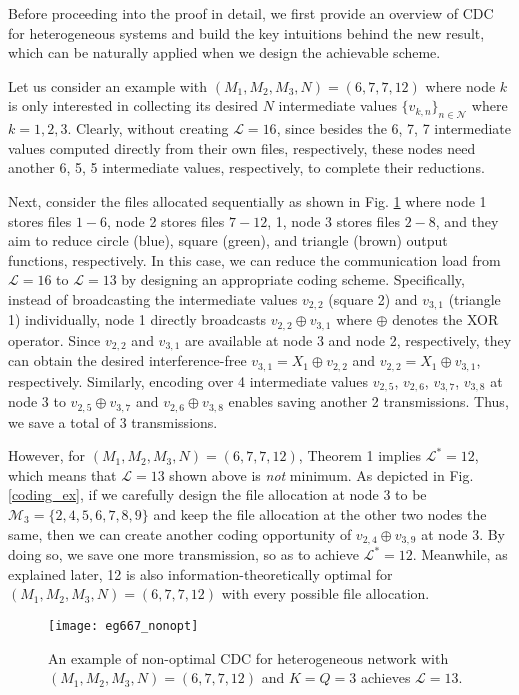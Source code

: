 \documentclass[conference]{IEEEtran}
\begin{document}
Before proceeding into the proof in detail, we first provide an overview of CDC for heterogeneous systems and build the key intuitions behind the new result, which can be naturally applied when we design the achievable scheme.

Let us consider an example with $(M_1,M_2,M_3,N)=(6,7,7,12)$ where node $k$ is only interested in collecting its desired $N$ intermediate values $\{v_{k,n}\}_{n\in\mathcal{N}}$ where $k=1,2,3$. Clearly, without creating $\mathcal{L}=16$, since besides the 6, 7, 7 intermediate values computed directly from their own files, respectively, these nodes need another 6, 5, 5 intermediate values, respectively, to complete their reductions.

Next, consider the files allocated sequentially as shown in Fig. \ref{coding_ex_non_opt} where node 1 stores files $1-6$, node 2 stores files $7-12$, 1, node 3 stores files $2-8$, and they aim to reduce circle (blue), square (green), and triangle (brown) output functions, respectively. In this case, we can reduce the communication load from $\mathcal{L}=16$ to $\mathcal{L}=13$ by designing an appropriate coding scheme. Specifically, instead of broadcasting the intermediate values $v_{2,2}$ (square 2) and $v_{3,1}$ (triangle 1) individually, node 1 directly broadcasts $v_{2,2}\oplus v_{3,1}$ where $\oplus$ denotes the XOR operator. Since $v_{2,2}$ and $v_{3,1}$ are available at node 3 and node 2, respectively, they can obtain the desired interference-free $v_{3,1}=X_1\oplus v_{2,2}$ and $v_{2,2}=X_1\oplus v_{3,1}$, respectively. Similarly, encoding over 4 intermediate values $v_{2,5}$, $v_{2,6}$, $v_{3,7}$, $v_{3,8}$ at node 3 to $v_{2,5}\oplus v_{3,7}$ and $v_{2,6}\oplus v_{3,8}$ enables saving another 2 transmissions. Thus, we save a total of 3 transmissions.


However, for $(M_1,M_2,M_3,N)=(6,7,7,12)$, Theorem 1 implies $\mathcal{L}^*=12$, which means that $\mathcal{L}=13$ shown above is \emph{not} minimum. As depicted in Fig. \ref{coding_ex}, if we carefully design the file allocation at node 3 to be $\mathcal{M}_3=\{2,4,5,6,7,8,9\}$ and keep the file allocation at the other two nodes the same, then we can create another coding opportunity of $v_{2,4}\oplus v_{3,9}$ at node 3. By doing so, we save one more transmission, so as to achieve $\mathcal{L}^*=12$. Meanwhile, as explained later, 12 is also information-theoretically optimal for $(M_1,\!M_2,\!M_3,\!N)\!=\!(6,7,7,12)$ with every possible file allocation.


\begin{figure}[!t] \centering %
\texttt{[image: eg667\_nonopt]}%
\caption{An example of non-optimal CDC for heterogeneous network with $(M_1,M_2,M_3,N)=(6,7,7,12)$ and $K=Q=3$ achieves ${\mathcal L}=13$.}\label{coding_ex_non_opt}%
\end{figure}
\end{document}
